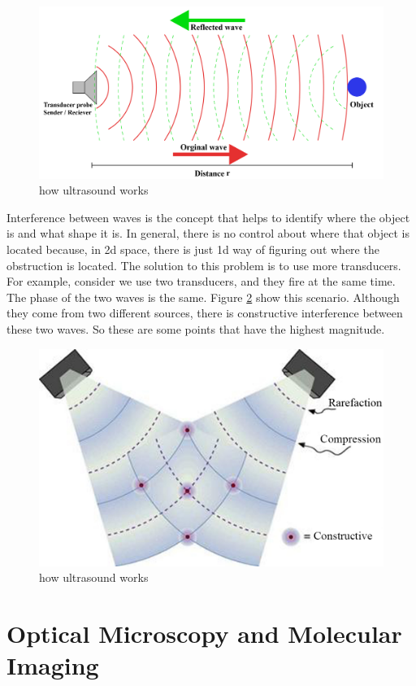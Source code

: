 \begin{figure}[htbp]
	\centering \includegraphics[width=0.7\columnwidth]{./figures/Fig11.png}
	\caption{how ultrasound works}
	\label{fig11}
\end{figure}

Interference between waves is the concept that helps to identify where the object is and what shape it is. In general, there is no control about where that object is located because, in 2d space, there is just 1d way of figuring out where the obstruction is located. The solution to this problem is to use more transducers. For example, consider we use two transducers, and they fire at the same time. The phase of the two waves is the same. Figure \ref{fig12} show this scenario. Although they come from two different sources, there is constructive interference between these two waves. So these are some points that have the highest magnitude.

\begin{figure}[htbp]
	\centering \includegraphics[width=0.7\columnwidth]{./figures/Fig12.jpg}
	\caption{how ultrasound works}
	\label{fig12}
\end{figure}

\section{Optical Microscopy and Molecular Imaging}

